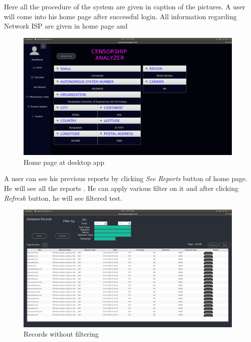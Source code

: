 Here all the procedure of the system are given in caption of the pictures.
A user will come into his home page after successful login. All information regarding Network ISP are given in home page and 
\begin{figure}[h]
    \centering
    \includegraphics[width=\textwidth]{usersite/home.png}
    \caption{Home page at desktop app}
    \label{fig:user0}
\end{figure}

A user can see his previous reports by clicking \emph{See Reports} button of home page.
He will see all the reports . He can apply various filter on it and after clicking \emph{Refresh} button, he will see filtered test.

\begin{figure}[h]
    \centering
    \includegraphics[width=\textwidth]{usersite/1recordswithoutfilter.png}
    \caption{Records without filtering}
    \label{fig:user1}
\end{figure}

